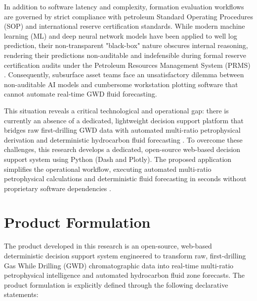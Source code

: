 In addition to software latency and complexity, formation evaluation workflows are governed by strict compliance with petroleum Standard Operating Procedures (SOP) and international reserve certification standards. While modern machine learning (ML) and deep neural network models have been applied to well log prediction, their non-transparent "black-box" nature obscures internal reasoning, rendering their predictions non-auditable and indefensible during formal reserve certification audits under the \citet{ref3} Petroleum Resources Management System (PRMS) \citep{ref1, ref3}. Consequently, subsurface asset teams face an unsatisfactory dilemma between non-auditable AI models and cumbersome workstation plotting software that cannot automate real-time GWD fluid forecasting.

This situation reveals a critical technological and operational gap: there is currently an absence of a dedicated, lightweight decision support platform that bridges raw first-drilling GWD data with automated multi-ratio petrophysical derivation and deterministic hydrocarbon fluid forecasting \citep{ref8, wood2020}. To overcome these challenges, this research develops a dedicated, open-source web-based decision support system using Python (Dash and Plotly). The proposed application simplifies the operational workflow, executing automated multi-ratio petrophysical calculations and deterministic fluid forecasting in seconds without proprietary software dependencies \citep{ref3, ref8, ref11, ref12}.

\section{Product Formulation}

The product developed in this research is an open-source, web-based deterministic decision support system engineered to transform raw, first-drilling Gas While Drilling (GWD) chromatographic data into real-time multi-ratio petrophysical intelligence and automated hydrocarbon fluid zone forecasts. The product formulation is explicitly defined through the following declarative statements:


